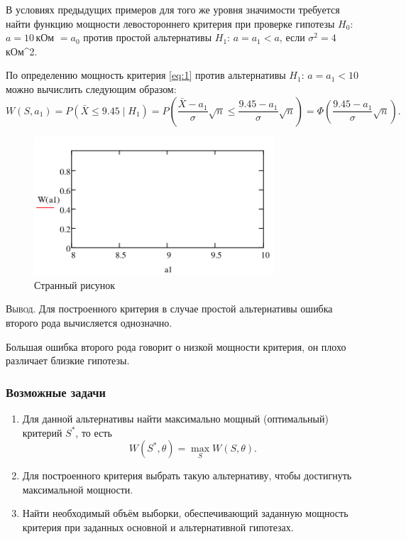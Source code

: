 \begin{ex}
	В условиях предыдущих примеров для того же уровня значимости требуется найти
	функцию мощности левостороннего критерия при проверке гипотезы $ H_0 $: $ a =
	10$\,кОм $ = a_0 $ против простой альтернативы $ H_1 $: $ a = a_1 < a $, если
	$ \sigma^2 = 4 $\,кОм^2.
\begin{solution}
	По определению мощность критерия \eqref{eq:1} против альтернативы $ H_1 $: $ a
	= a_1 < 10$ можно вычислить следующим образом: 
	\[
			W(S, a_1) = P(\bar X \leqslant 9.45\mid H_1) = P \left( \frac{\bar X -
			a_1}{\sigma} \sqrt n \leqslant \frac{9.45 - a_1}{\sigma} \sqrt n \right) =
			\Phi  \left( \frac{9.45 - a_1}{\sigma}\sqrt n \right).
	\]
	\begin{figure}[h!]
		\centering
		\includegraphics[width=0.8\textwidth]{Figures/9-plot2.png}
    \caption{Странный рисунок}
		\label{fig:9-plot2}
	\end{figure}
\end{solution}
\end{ex}

\textsc{Вывод}.
Для построенного критерия в случае простой альтернативы ошибка второго рода 
вычисляется однозначно. 

 Большая ошибка второго рода говорит о низкой мощности критерия, он плохо различает 
близкие гипотезы. 

\subsubsection{Возможные задачи}
\begin{enumerate}
	\item Для данной альтернативы найти максимально мощный (оптимальный) критерий
		$ S^\ast $, то есть  
		\[
				W(S^\ast, \theta) = \max_S W(S,\theta).
		\]
	\item Для построенного критерия выбрать такую альтернативу, чтобы достигнуть
		максимальной мощности.
	\item Найти необходимый объём выборки, обеспечивающий заданную мощность
		критерия при заданных основной и альтернативной гипотезах.
\end{enumerate}


